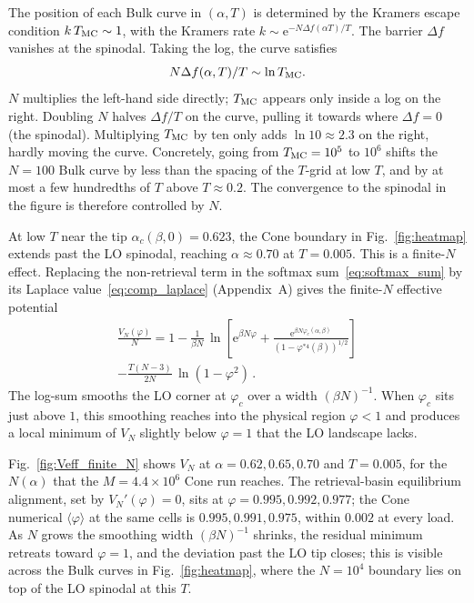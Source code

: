\documentclass[letterpaper]{article} %
\newcommand{\e}{{\mathrm{e}}}
\newcommand{\Bnet}{\beta}
\newcommand{\ac}{\alpha_c}
\begin{document}
The position of each Bulk curve in $(\alpha, T)$ is determined by the Kramers escape condition $k\,T_{\rm MC} \sim 1$, with the Kramers rate $k \sim \e^{-N \Delta f(\alpha T) / T}$. The barrier $\Delta f$ vanishes at the spinodal. Taking the log, the curve satisfies
\begin{equation}
	{N\Delta f(\alpha, T)}/{T} \sim \ln T_{\rm MC}.
	\label{eq:bulk_kramers}
\end{equation}
$N$ multiplies the left-hand side directly; $T_{\rm MC}$ appears only inside a log on the right. Doubling $N$ halves $\Delta f / T$ on the curve, pulling it towards where $\Delta f = 0$ (the spinodal). Multiplying $T_{\rm MC}$ by ten only adds $\ln 10 \approx 2.3$ on the right, hardly moving the curve. Concretely, going from $T_{\rm MC} = 10^5$ to $10^6$ shifts the $N = 100$ Bulk curve by less than the spacing of the $T$-grid at low $T$, and by at most a few hundredths of $T$ above $T \approx 0.2$. The convergence to the spinodal in the figure is therefore controlled by $N$.

At low $T$ near the tip $\ac(\Bnet, 0) = 0.623$, the Cone boundary in Fig.~\ref{fig:heatmap} extends past the LO spinodal, reaching $\alpha \approx 0.70$ at $T = 0.005$. This is a finite-$N$ effect. Replacing the non-retrieval term in the softmax sum~\eqref{eq:softmax_sum} by its Laplace value~\eqref{eq:comp_laplace} (Appendix~A) gives the finite-$N$ effective potential
\begin{multline}
\frac{V_N(\varphi)}{N} = 1 - \frac{1}{\Bnet N}\,
   \ln\!\left[\e^{\Bnet N \varphi} +
            \frac{\e^{\Bnet N \varphi_c(\alpha, \Bnet)}}{(1-\varphi^{*4}(\Bnet))^{1/2}} \right] \\
    - \frac{T(N-3)}{2N}\,\ln(1 - \varphi^{2})\,.
\label{eq:V-finite-N}
\end{multline}
The log-sum smooths the LO corner at $\varphi_c$ over a width $(\Bnet N)^{-1}$. When $\varphi_c$ sits just above $1$, this smoothing reaches into the physical region $\varphi < 1$ and produces a local minimum of $V_N$ slightly below $\varphi = 1$ that the LO landscape lacks.

Fig.~\ref{fig:Veff_finite_N} shows $V_N$ at $\alpha = 0.62, 0.65, 0.70$ and $T = 0.005$, for the $N(\alpha)$ that the $M = 4.4 \times 10^6$ Cone run reaches. The retrieval-basin equilibrium alignment, set by $V_N'(\varphi) = 0$, sits at $\varphi = 0.995, 0.992, 0.977$; the Cone numerical $\langle\varphi\rangle$ at the same cells is $0.995, 0.991, 0.975$, within $0.002$ at every load. As $N$ grows the smoothing width $(\Bnet N)^{-1}$ shrinks, the residual minimum retreats toward $\varphi = 1$, and the deviation past the LO tip closes; this is visible across the Bulk curves in Fig.~\ref{fig:heatmap}, where the $N = 10^4$ boundary lies on top of the LO spinodal at this $T$.
\end{document}
